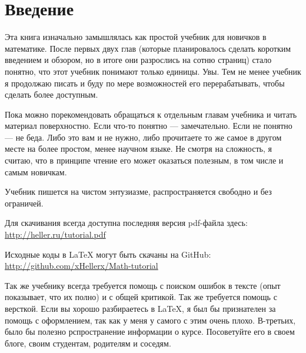 \chapter*{Введение}

Эта книга изначально замышлялась как простой учебник для новичков в математике. После первых двух глав (которые планировалось сделать коротким введением и обзором, но в итоге они разрослись на сотню страниц) стало понятно, что этот учебник понимают только единицы. Увы. Тем не менее учебник я продолжаю писать и буду по мере возможностей его перерабатывать, чтобы сделать более доступным.

Пока можно порекомендовать обращаться к отдельным главам учебника и читать материал поверхностно. Если что-то понятно --- замечательно. Если не понятно --- не беда. Либо это вам и не нужно, либо прочитаете то же самое в другом месте на более простом, менее научном языке. Не смотря на сложность, я считаю, что в принципе чтение его может оказаться полезным, в том числе и самым новичкам.

Учебник пишется на чистом энтузиазме, распространяется свободно и без ограничей.

Для скачивания всегда доступна последняя версия pdf-файла здесь: \url{http://heller.ru/tutorial.pdf}

Исходные коды в LaTeX могут быть скачаны на GitHub:
\url{http://github.com/xHellerx/Math-tutorial}

Так же учебнику всегда требуется помощь с поиском ошибок в тексте (опыт показывает, что их полно) и с общей критикой. Так же требуется помощь с версткой. Если вы хорошо разбираетесь в \LaTeX, я был бы признателен за помощь с оформлением, так как у меня у самого с этим очень плохо. В-третьих, было бы полезно рспространение информации о курсе. Посоветуйте его в своем блоге, своим студентам, родителям и соседям.
